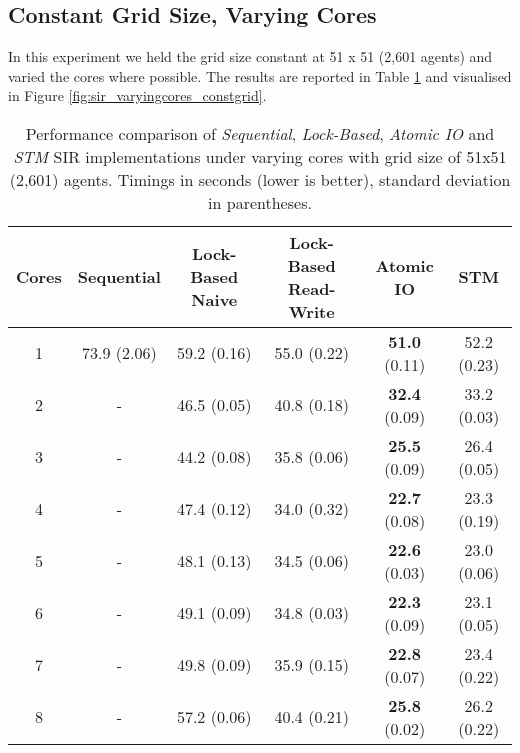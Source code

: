 \subsection{Constant Grid Size, Varying Cores}
In this experiment we held the grid size constant at 51 x 51 (2,601 agents) and varied the cores where possible. The results are reported in Table \ref{tab:sir_varyingcores_constgrid} and visualised in Figure \ref{fig:sir_varyingcores_constgrid}.

\begin{table}
	\centering
  	\begin{tabular}{ c || c | c | c | c | c }
        Cores & Sequential  & Lock-Based Naive & Lock-Based Read-Write & Atomic IO             & STM          \\ \hline \hline 
   		1     & 73.9 (2.06) & 59.2 (0.16)      & 55.0 (0.22)           & \textbf{51.0} (0.11)  & 52.2 (0.23)  \\ \hline
   		2     & -           & 46.5 (0.05)      & 40.8 (0.18)           & \textbf{32.4} (0.09)  & 33.2 (0.03)  \\ \hline
   		3     & -           & 44.2 (0.08)      & 35.8 (0.06)           & \textbf{25.5} (0.09)  & 26.4 (0.05)  \\ \hline
   		4     & -           & 47.4 (0.12)      & 34.0 (0.32)           & \textbf{22.7} (0.08)  & 23.3 (0.19)  \\ \hline
   		5     & -           & 48.1 (0.13)      & 34.5 (0.06)           & \textbf{22.6} (0.03)  & 23.0 (0.06)  \\ \hline
   		6     & -           & 49.1 (0.09)      & 34.8 (0.03)           & \textbf{22.3} (0.09)  & 23.1 (0.05)  \\ \hline
   		7     & -           & 49.8 (0.09)      & 35.9 (0.15)           & \textbf{22.8} (0.07)  & 23.4 (0.22)  \\ \hline
   		8     & -           & 57.2 (0.06)      & 40.4 (0.21)           & \textbf{25.8} (0.02)  & 26.2 (0.22)  \\ \hline \hline
  	\end{tabular}

  	\caption{Performance comparison of \textit{Sequential}, \textit{Lock-Based}, \textit{Atomic IO} and \textit{STM} SIR implementations under varying cores with grid size of 51x51 (2,601) agents. Timings in seconds (lower is better), standard deviation in parentheses.}
	\label{tab:sir_varyingcores_constgrid}
\end{table}

